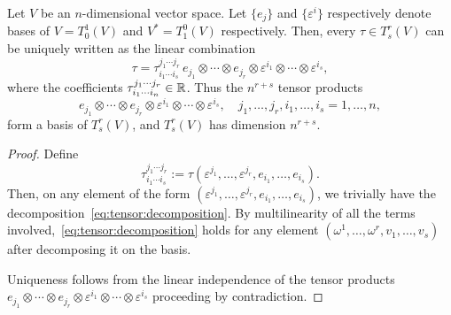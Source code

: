 \begin{proposition}\label{prop:tensorbasis}
  Let $V$ be an $n$-dimensional vector space.
  Let $\{e_j\}$ and $\{\varepsilon^i\}$ respectively denote bases of $V=T_0^1(V)$ and $V^*=T_1^0(V)$ respectively.
  Then, every $\tau\in T_s^r(V)$ can be uniquely written as the linear combination%
  \begin{equation}\label{eq:tensor:decomposition}
    \tau = \tau^{j_1\cdots j_r}_{i_1\cdots i_s} \, e_{j_1}\otimes\cdots\otimes e_{j_r}\otimes \varepsilon^{i_1}\otimes \cdots\otimes \varepsilon^{i_s},
  \end{equation}
  where the coefficients $\tau^{j_1\cdots j_r}_{i_1\cdots i_n}\in\mathbb{R}$.
  Thus the $n^{r+s}$ tensor products
  \begin{equation}\label{eq:tensor:decompo}
    e_{j_1}\otimes\cdots\otimes e_{j_r}\otimes \varepsilon^{i_1}\otimes \cdots\otimes \varepsilon^{i_s}, \quad j_1,\ldots,j_r, i_1,\ldots,i_s = 1,\ldots,n,
  \end{equation}
  form a basis of $T_s^r(V)$, and $T_s^r(V)$ has dimension $n^{r+s}$.
\end{proposition}

\begin{proof}
  Define
  \begin{equation}
    \tau^{j_1\cdots j_r}_{i_1\cdots i_s} := \tau(\varepsilon^{j_1}, \ldots, \varepsilon^{j_r}, e_{i_1}, \ldots, e_{i_s}).
  \end{equation}
  Then, on any element of the form $(\varepsilon^{j_1}, \ldots, \varepsilon^{j_r}, e_{i_1}, \ldots, e_{i_s})$, we trivially have the decomposition~\eqref{eq:tensor:decomposition}.
  By multilinearity of all the terms involved,~\eqref{eq:tensor:decomposition} holds for any element $(\omega^1, \ldots, \omega^r, v_1, \ldots, v_s)$ after decomposing it on the basis.

  Uniqueness follows from the linear independence of the tensor products $e_{j_1}\otimes\cdots\otimes e_{j_r}\otimes \varepsilon^{i_1}\otimes \cdots\otimes \varepsilon^{i_s}$ proceeding by contradiction.
\end{proof}

